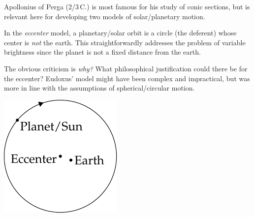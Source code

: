 \begin{minipage}[t]{0.74\linewidth}\vspace{0pt}
	 Apollonius of Perga (2\nd/3\rd{}\,C.\BC) is most famous for his study of conic sections, but is relevant here for developing two models of solar/planetary motion.\smallbreak
	
	In the \emph{eccenter} model, a planetary/solar orbit is a circle (the deferent) whose center is \emph{not} the earth. This straightforwardly addresses the problem of variable brightness since the planet is not a fixed distance from the earth.\smallbreak
	
	The obvious criticism is \emph{why?} What philosophical justification could there be for the eccenter? Eudoxus' model might have been complex and impractical, but was more in line with the assumptions of spherical/circular motion.
\end{minipage}
\hfill
\begin{minipage}[t]{0.25\linewidth}\vspace{0pt}
  \flushright\includegraphics[scale=0.95]{trig-deferent}\phantom{b}
\end{minipage}
\medbreak
  

